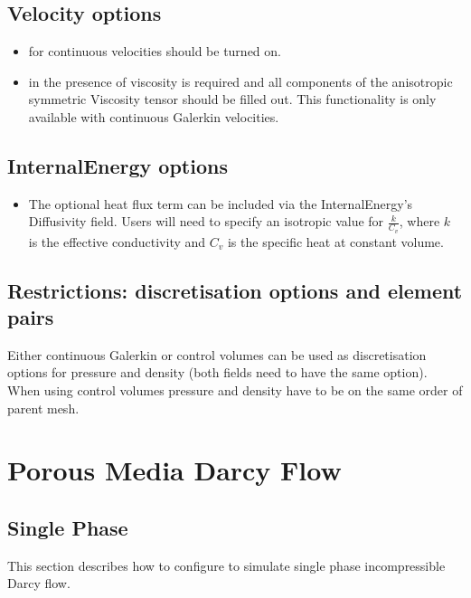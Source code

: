 \subsection{Velocity options}
\begin{itemize}
\item for continuous velocities  should be turned on.
\item in the presence of viscosity  is required and all components of the anisotropic symmetric Viscosity tensor should be filled out.  This functionality is only available with continuous Galerkin velocities.
\end{itemize}

\subsection{InternalEnergy options}
\begin{itemize}
\item The optional heat flux term can be included via the InternalEnergy's Diffusivity field. Users will need to specify an isotropic value for $\frac{k}{C_v}$, where $k$ is the effective conductivity and $C_v$ is the specific heat at constant volume.
\end{itemize}

\subsection{Restrictions: discretisation options and element pairs}
Either continuous Galerkin or control volumes can be used as discretisation options for pressure and density (both fields need to have the same option). When using control volumes pressure and density have to be on the same order of parent mesh.

\section{Porous Media Darcy Flow}
\label{sec:porous_media_darcy_flow_configure}

\subsection{Single Phase}

This section describes how to configure \fluidity to simulate single phase incompressible Darcy flow.

